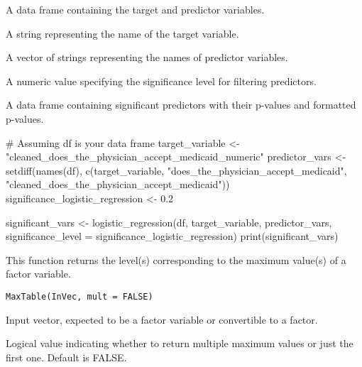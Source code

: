\documentclass[a4paper]{book}
\begin{document}
%
\begin{Arguments}
\begin{ldescription}
\item[\code{df}] A data frame containing the target and predictor variables.

\item[\code{target\_variable}] A string representing the name of the target variable.

\item[\code{predictor\_vars}] A vector of strings representing the names of predictor variables.

\item[\code{significance\_level}] A numeric value specifying the significance level for filtering predictors.
\end{ldescription}
\end{Arguments}
%
\begin{Value}
A data frame containing significant predictors with their p-values and formatted p-values.
\end{Value}
%
\begin{Examples}
\begin{ExampleCode}
# Assuming df is your data frame
target_variable <- "cleaned_does_the_physician_accept_medicaid_numeric"
predictor_vars <- setdiff(names(df), c(target_variable, "does_the_physician_accept_medicaid", "cleaned_does_the_physician_accept_medicaid"))
significance_logistic_regression <- 0.2

significant_vars <- logistic_regression(df, target_variable, predictor_vars, significance_level = significance_logistic_regression)
print(significant_vars)
\end{ExampleCode}
\end{Examples}
%
\begin{Description}
This function returns the level(s) corresponding to the maximum value(s) of a factor variable.
\end{Description}
%
\begin{Usage}
\begin{verbatim}
MaxTable(InVec, mult = FALSE)
\end{verbatim}
\end{Usage}
%
\begin{Arguments}
\begin{ldescription}
\item[\code{InVec}] Input vector, expected to be a factor variable or convertible to a factor.

\item[\code{mult}] Logical value indicating whether to return multiple maximum values or just the first one. Default is FALSE.
\end{ldescription}
\end{Arguments}
\end{document}
